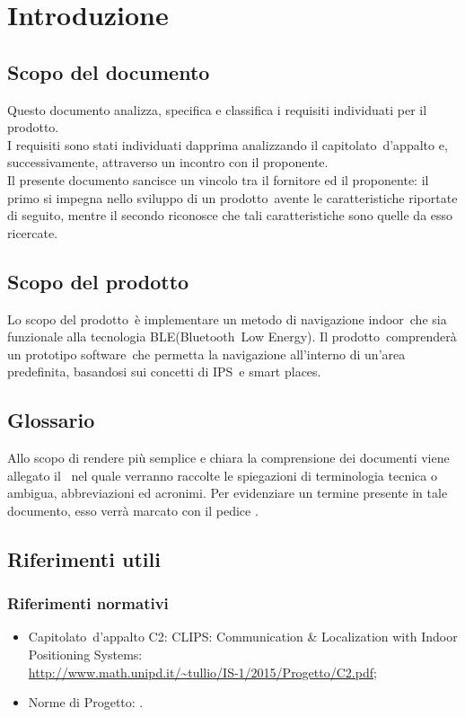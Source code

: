\documentclass[../AnalisiDeiRequisiti.tex]{subfiles}
\begin{document}
\section{Introduzione}
	\subsection{Scopo del documento}
	Questo documento analizza, specifica e classifica i requisiti individuati per il prodotto\g.\\
	I requisiti sono stati individuati dapprima analizzando il capitolato\g\ d’appalto e, successivamente, attraverso un incontro con il proponente.\\
	Il presente documento sancisce un vincolo tra il fornitore ed il proponente: il primo si impegna nello sviluppo di un prodotto\g\ avente le caratteristiche riportate di seguito, mentre il secondo 				riconosce che tali caratteristiche sono quelle da esso ricercate.

	\subsection{Scopo del prodotto}
	Lo scopo del prodotto\g\ è implementare un metodo di navigazione indoor\g\ che sia funzionale alla tecnologia BLE\g(Bluetooth\g\ Low Energy). Il prodotto\g\ 
comprenderà un prototipo software\g\ che permetta la navigazione all’interno di un’area predefinita, basandosi sui concetti di IPS\g\ e smart places\g.
	
	\subsection{Glossario} 
	Allo scopo di rendere più semplice e chiara la comprensione dei documenti viene allegato il \glossariov\ nel quale verranno raccolte le spiegazioni di  terminologia tecnica o  ambigua,
abbreviazioni ed acronimi. Per evidenziare un termine presente in tale documento, esso verrà marcato con il pedice \g.
	
	\subsection{Riferimenti utili}
		\subsubsection{Riferimenti normativi}
		\begin{itemize}
			\item Capitolato\g\ d’appalto C2: CLIPS\g: Communication \& Localization with Indoor Positioning Systems: \\\url{http://www.math.unipd.it/~tullio/IS-1/2015/Progetto/C2.pdf};
			\item Norme di Progetto: \normediprogettov.
		\end{itemize}
\end{document}
